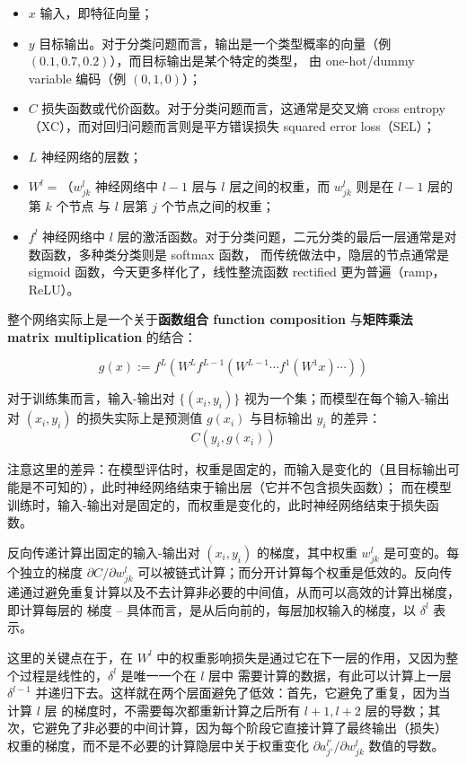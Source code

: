 \documentclass[../studies-ml.tex]{subfiles}
\begin{document}
\begin{itemize}
  \item $x$ 输入，即特征向量；
  \item $y$ 目标输出。对于分类问题而言，输出是一个类型概率的向量（例 $(0.1, 0.7, 0.2)$），而目标输出是某个特定的类型，
        由 one-hot/dummy variable 编码（例 $(0, 1, 0)$）；
  \item $C$ 损失函数或代价函数。对于分类问题而言，这通常是交叉熵 cross entropy（XC），而对回归问题而言则是平方错误损失
        squared error loss（SEL）；
  \item $L$ 神经网络的层数；
  \item $W^l = （w_{jk}^l$ 神经网络中 $l-1$ 层与 $l$ 层之间的权重，而 $w_{jk}^l$ 则是在 $l-1$ 层的第 $k$ 个节点
        与 $l$ 层第 $j$ 个节点之间的权重；
  \item $f^l$ 神经网络中 $l$ 层的激活函数。对于分类问题，二元分类的最后一层通常是对数函数，多种类分类则是 softmax 函数，
        而传统做法中，隐层的节点通常是 sigmoid 函数，今天更多样化了，线性整流函数 rectified 更为普遍（ramp，ReLU）。
\end{itemize}

整个网络实际上是一个关于\textbf{函数组合 function composition} 与\textbf{矩阵乘法 matrix multiplication} 的结合：

\[
  g(x) := f^L (W^L f^{L-1}(W^{L-1} \cdots f^1(W^1x) \cdots))
\]

对于训练集而言，输入-输出对 $\{(x_i, y_i)\}$ 视为一个集；而模型在每个输入-输出对 $(x_i, y_i)$ 的损失实际上是预测值 $g(x_i)$
与目标输出 $y_i$ 的差异：
\[ C(y_i, g(x_i)) \]

注意这里的差异：在模型评估时，权重是固定的，而输入是变化的（且目标输出可能是不可知的），此时神经网络结束于输出层（它并不包含损失函数）；
而在模型训练时，输入-输出对是固定的，而权重是变化的，此时神经网络结束于损失函数。

反向传递计算出固定的输入-输出对 $(x_i, y_i)$ 的梯度，其中权重 $w_{jk}^l$ 是可变的。每个独立的梯度 $\partial C/\partial w_{jk}^l$
可以被链式计算；而分开计算每个权重是低效的。反向传递通过避免重复计算以及不去计算非必要的中间值，从而可以高效的计算出梯度，即计算每层的
梯度 -- 具体而言，是从后向前的，每层加权输入的梯度，以 $\delta^l$ 表示。

这里的关键点在于，在 $W^l$ 中的权重影响损失是通过它在下一层的作用，又因为整个过程是线性的，$\delta^l$ 是唯一一个在 $l$ 层中
需要计算的数据，有此可以计算上一层 $\delta^{l-1}$ 并递归下去。这样就在两个层面避免了低效：首先，它避免了重复，因为当计算 $l$ 层
的梯度时，不需要每次都重新计算之后所有 $l+1, l+2$ 层的导数；其次，它避免了非必要的中间计算，因为每个阶段它直接计算了最终输出（损失）
权重的梯度，而不是不必要的计算隐层中关于权重变化 $\partial a_{j'}^{l'} / \partial w_{jk}^l$ 数值的导数。
\end{document}
